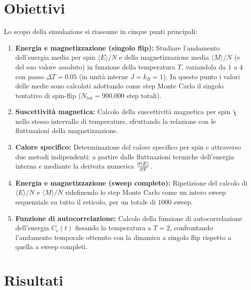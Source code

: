 \documentclass[12pt,a4paper, italian]{article}
\begin{document}
\section{Obiettivi}
Lo scopo della simulazione si riassume in cinque punti principali:

\begin{enumerate}
    \item \textbf{Energia e magnetizzazione (singolo flip):} Studiare l'andamento dell'energia media per spin $\langle E \rangle / N$ e della magnetizzazione media $\langle M \rangle / N$ (e del suo valore assoluto) in funzione della temperatura $T$, variandola da $1$ a $4$ con passo $\Delta T = 0.05$ (in unità interne $J=k_B=1$). In questo punto i valori delle medie sono calcolati adottando come step Monte Carlo il singolo tentativo di spin-flip ($N_{\text{tot}}= 900.000$ step totali).

    \item \textbf{Suscettività magnetica:} Calcolo della suscettività magnetica per spin $\tilde{\chi}$ nello stesso intervallo di temperature, sfruttando la relazione con le fluttuazioni della magnetizzazione.

    \item \textbf{Calore specifico:} Determinazione del calore specifico per spin $c$ attraverso due metodi indipendenti: a partire dalle fluttuazioni termiche dell'energia interna e mediante la derivata numerica $\pdv{\ev{E}}{T}$.

    \item \textbf{Energia e magnetizzazione (sweep completo):} Ripetizione del calcolo di $\langle E \rangle / N$ e $\langle M \rangle / N$ ridefinendo lo step Monte Carlo come un intero sweep sequenziale su tutto il reticolo, per un totale di $1000$ sweep.

    \item \textbf{Funzione di autocorrelazione:} Calcolo della funzione di autocorrelazione dell'energia $C_c(t)$ fissando la temperatura a $T = 2$, confrontando l'andamento temporale ottenuto con la dinamica a singolo flip rispetto a quella a sweep completi.
\end{enumerate}

\section{Risultati}
\end{document}
